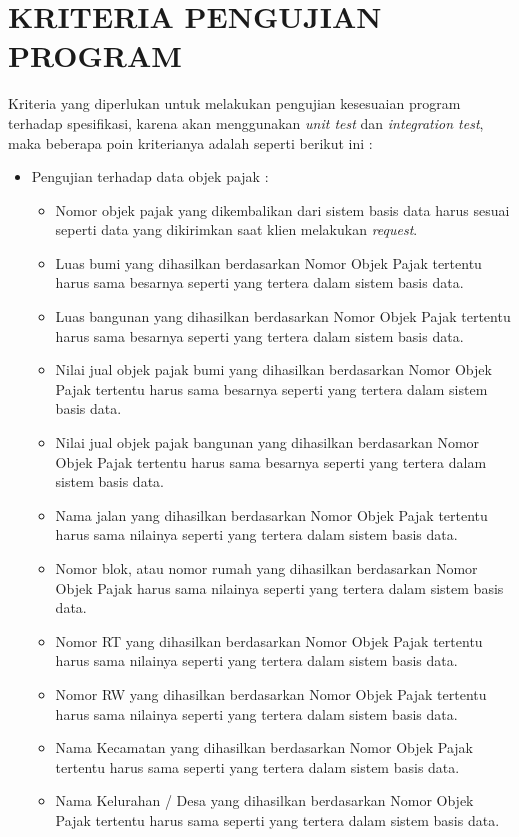 \chapter{KRITERIA PENGUJIAN PROGRAM}

Kriteria yang diperlukan untuk melakukan pengujian kesesuaian program terhadap spesifikasi, karena akan menggunakan \textit{unit test} dan \textit{integration test}, maka beberapa poin kriterianya adalah seperti berikut ini :

\begin{itemize}
	\item Pengujian terhadap data objek pajak :
	
	\begin{itemize}
		\item Nomor objek pajak yang dikembalikan dari sistem basis data harus sesuai seperti data yang dikirimkan saat klien melakukan \textit{request}.
		\item Luas bumi yang dihasilkan berdasarkan Nomor Objek Pajak tertentu harus sama besarnya seperti yang tertera dalam sistem basis data.
		\item Luas bangunan yang dihasilkan berdasarkan Nomor Objek Pajak tertentu harus sama besarnya seperti yang tertera dalam sistem basis data.
		\item Nilai jual objek pajak bumi yang dihasilkan berdasarkan Nomor Objek Pajak tertentu harus sama besarnya seperti yang tertera dalam sistem basis data.
		\item Nilai jual objek pajak bangunan yang dihasilkan berdasarkan Nomor Objek Pajak tertentu harus sama besarnya seperti yang tertera dalam sistem basis data.
		\item Nama jalan yang dihasilkan berdasarkan Nomor Objek Pajak tertentu harus sama nilainya seperti yang tertera dalam sistem basis data.
		\item Nomor blok, atau nomor rumah yang dihasilkan berdasarkan Nomor Objek Pajak harus sama nilainya seperti yang tertera dalam sistem basis data.
		\item Nomor RT yang dihasilkan berdasarkan Nomor Objek Pajak tertentu harus sama nilainya seperti yang tertera dalam sistem basis data.
		\item Nomor RW yang dihasilkan berdasarkan Nomor Objek Pajak tertentu harus sama nilainya seperti yang tertera dalam sistem basis data.
		\item Nama Kecamatan yang dihasilkan berdasarkan Nomor Objek Pajak tertentu harus sama seperti yang tertera dalam sistem basis data.
		\item Nama Kelurahan / Desa yang dihasilkan berdasarkan Nomor Objek Pajak tertentu harus sama seperti yang tertera dalam sistem basis data.
	\end{itemize}
	

\end{itemize}
